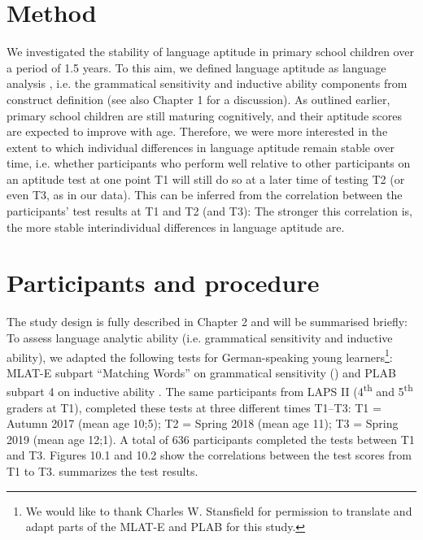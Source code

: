 \documentclass[output=paper]{langsci/langscibook}
\begin{document}
\section{Method}

We investigated the stability of language aptitude in primary school children over a period of 1.5 years. To this aim, we defined language aptitude as language analysis \citep{Skehan1998}, i.e. the grammatical sensitivity and inductive ability components from  construct definition (see also Chapter 1 for a discussion). As outlined earlier, primary school children are still maturing cognitively, and their aptitude scores are expected to improve with age. Therefore, we were more interested in the extent to which individual differences in language aptitude remain stable over time, i.e. whether participants who perform well relative to other participants on an aptitude test at one point T1 will still do so at a later time of testing T2 (or even T3, as in our data). This can be inferred from the correlation between the participants’ test results at T1 and T2 (and T3): The stronger this correlation is, the more stable interindividual differences in language aptitude are. 

 \section{Participants and procedure}


The study design is fully described in Chapter 2 and will be summarised briefly: To assess language analytic ability (i.e. grammatical sensitivity and inductive ability), we adapted the following tests for German-speaking young learners\footnote{We would like to thank Charles W. Stansfield for permission to translate and adapt parts of the MLAT-E and PLAB for this study.}: MLAT-E subpart “Matching Words” on grammatical sensitivity (\citealt{CarrollSapon1976}) and PLAB subpart 4 on inductive ability \citep{PimsleurEtAl2004}. The same participants from LAPS II (4\textsuperscript{th} and 5\textsuperscript{th} graders at T1), completed these tests at three different times T1--T3: T1 = Autumn 2017 (mean age 10;5); T2 = Spring 2018 (mean age 11); T3 = Spring 2019 (mean age 12;1). A total of 636 participants completed the tests between T1 and T3. Figures 10.1 and 10.2 show the correlations between the test scores from T1 to T3.  summarizes the test results. 
\end{document}
